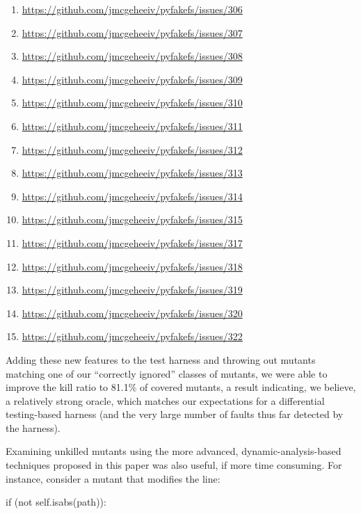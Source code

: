 \documentclass{svjour3}
\begin{document}
\begin{enumerate}
\item \url{https://github.com/jmcgeheeiv/pyfakefs/issues/306}
\item \url{https://github.com/jmcgeheeiv/pyfakefs/issues/307}
\item \url{https://github.com/jmcgeheeiv/pyfakefs/issues/308}
\item \url{https://github.com/jmcgeheeiv/pyfakefs/issues/309}
\item \url{https://github.com/jmcgeheeiv/pyfakefs/issues/310}
\item \url{https://github.com/jmcgeheeiv/pyfakefs/issues/311}
\item \url{https://github.com/jmcgeheeiv/pyfakefs/issues/312}
\item \url{https://github.com/jmcgeheeiv/pyfakefs/issues/313}
\item \url{https://github.com/jmcgeheeiv/pyfakefs/issues/314}
\item \url{https://github.com/jmcgeheeiv/pyfakefs/issues/315}
\item \url{https://github.com/jmcgeheeiv/pyfakefs/issues/317}
\item \url{https://github.com/jmcgeheeiv/pyfakefs/issues/318}
\item \url{https://github.com/jmcgeheeiv/pyfakefs/issues/319}
\item \url{https://github.com/jmcgeheeiv/pyfakefs/issues/320}
\item \url{https://github.com/jmcgeheeiv/pyfakefs/issues/322}
\end{enumerate}

Adding these new features to the test harness and throwing out mutants
matching one of our ``correctly ignored'' classes of mutants, we were
able to improve the kill ratio to 81.1\% of covered mutants, a result
indicating, we believe, a relatively strong oracle, which matches our
expectations for a differential testing-based harness (and the very
large number of faults thus far detected by the harness).

Examining unkilled mutants using the more advanced,
dynamic-analysis-based techniques proposed in this paper was also
useful, if more time consuming.  For instance, consider a mutant that
modifies the line:


\begin{code}
         if (not self.isabs(path)):

\end{code}
\end{document}
